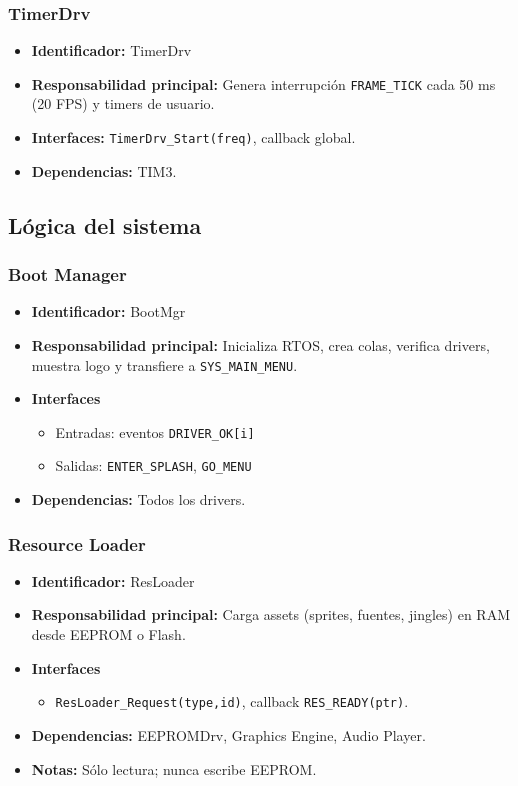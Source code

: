 \documentclass[11pt,a4paper]{article}
\begin{document}
\subsubsection{TimerDrv}
\begin{itemize}
  \item \textbf{Identificador:} TimerDrv
  \item \textbf{Responsabilidad principal:} Genera interrupción \texttt{FRAME\_TICK} cada 50 ms (20 FPS) y timers de usuario.
  \item \textbf{Interfaces:} \texttt{TimerDrv\_Start(freq)}, callback global.
  \item \textbf{Dependencias:} TIM3.
\end{itemize}

\subsection{Lógica del sistema}

\subsubsection{Boot Manager}
\begin{itemize}
  \item \textbf{Identificador:} BootMgr
  \item \textbf{Responsabilidad principal:} Inicializa RTOS, crea colas, verifica drivers, muestra logo y transfiere a \texttt{SYS\_MAIN\_MENU}.
  \item \textbf{Interfaces}
    \begin{itemize}
      \item Entradas: eventos \texttt{DRIVER\_OK[i]}
      \item Salidas: \texttt{ENTER\_SPLASH}, \texttt{GO\_MENU}
    \end{itemize}
  \item \textbf{Dependencias:} Todos los drivers.
\end{itemize}

\subsubsection{Resource Loader}
\begin{itemize}
  \item \textbf{Identificador:} ResLoader
  \item \textbf{Responsabilidad principal:} Carga assets (sprites, fuentes, jingles) en RAM desde EEPROM o Flash.
  \item \textbf{Interfaces} 
    \begin{itemize}
      \item \texttt{ResLoader\_Request(type,id)}, callback \texttt{RES\_READY(ptr)}.
    \end{itemize}
  \item \textbf{Dependencias:} EEPROMDrv, Graphics Engine, Audio Player.
  \item \textbf{Notas:} Sólo lectura; nunca escribe EEPROM.
\end{itemize}
\end{document}
